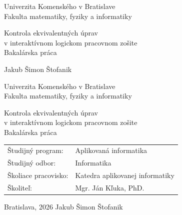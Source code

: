 \documentclass[12pt, oneside]{book}  %
\def\mfrok{2026}
\def\mfnazov{Kontrola ekvivalentných úprav\\ v interaktívnom logickom pracovnom zošite}
\def\mftyp{Bakalárska práca}
\def\mfautor{Jakub Šimon Štofanik}
\def\mfskolitel{Mgr. Ján Kľuka, PhD.}
\def\mfmiesto{Bratislava, \mfrok}
\def\mfodbor{ Informatika}
\def\program{ Aplikovaná informatika }
\def\mfpracovisko{ Katedra aplikovanej informatiky }
\begin{document}
     
\frontmatter
\pagestyle{empty}


\begin{center}
\sc\large
Univerzita Komenského v Bratislave\\
Fakulta matematiky, fyziky a informatiky

\vfill

{\LARGE\mfnazov}\\
\mftyp
\end{center}

\vfill

{\sc\large 
\noindent \mfrok \hfill
\mfautor
}

\cleardoublepage



\noindent

\begin{center}
\sc  
\large
Univerzita Komenského v Bratislave\\
Fakulta matematiky, fyziky a informatiky

\vfill

{\LARGE\mfnazov}\\
\mftyp
\end{center}

\vfill

\noindent
\begin{tabular}{ll}
Študijný program: & \program \\
Študijný odbor: & \mfodbor \\
Školiace pracovisko: & \mfpracovisko \\
Školiteľ: & \mfskolitel \\
\end{tabular}

\vfill


\noindent \mfmiesto \hfill
\mfautor

\cleardoublepage



\newpage 
\setcounter{page}{2}


\end{document}
